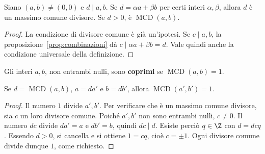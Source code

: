 \begin{proposizione}\label{prop:criterio-mcd}
Siano $(a,b)\ne(0,0)$ e $d\mid a,b$. Se $d=\alpha a+\beta b$ per certi interi $\alpha,\beta$, allora $d$ è un massimo comune divisore. Se $d>0$, è $\operatorname{MCD}(a,b)$.
\end{proposizione}
\begin{proof}
La condizione di divisore comune è già un'ipotesi. Se $c\mid a,b$, la proposizione~\ref{prop:combinazioni} dà $c\mid\alpha a+\beta b=d$. Vale quindi anche la condizione universale della definizione.
\end{proof}

\begin{definizione}
Gli interi $a,b$, non entrambi nulli, sono \textbf{coprimi} se $\operatorname{MCD}(a,b)=1$.
\end{definizione}

\begin{proposizione}
Se $d=\operatorname{MCD}(a,b)$, $a=da'$ e $b=db'$, allora $\operatorname{MCD}(a',b')=1$.
\end{proposizione}
\begin{proof}
Il numero $1$ divide $a',b'$. Per verificare che è un massimo comune divisore, sia $c$ un loro divisore comune. Poiché $a',b'$ non sono entrambi nulli, $c\ne0$. Il numero $dc$ divide $da'=a$ e $db'=b$, quindi $dc\mid d$. Esiste perciò $q\in\Z$ con $d=dcq$. Essendo $d>0$, si cancella e si ottiene $1=cq$, cioè $c=\pm1$. Ogni divisore comune divide dunque $1$, come richiesto.
\end{proof}

